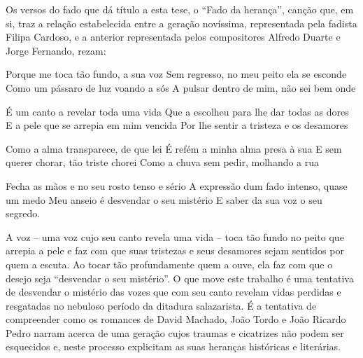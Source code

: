 \documentclass[../DISSERTACAO_MAIN.tex]{subfiles}
\begin{document}
Os versos do fado que dá título a esta tese, o “Fado da herança”, canção que, em si, traz a relação estabelecida entre a geração novíssima, representada pela fadista Filipa Cardoso, e a anterior representada pelos compositores Alfredo Duarte e Jorge Fernando, rezam:

Porque me toca tão fundo, a sua voz
Sem regresso, no meu peito ela se esconde
Como um pássaro de luz voando a sós
A pulsar dentro de mim, não sei bem onde

É um canto a revelar toda uma vida
Que a escolheu para lhe dar todas as dores
E a pele que se arrepia em mim vencida
Por lhe sentir a tristeza e os desamores

Como a alma transparece, de que lei
É refém a minha alma presa à sua
E sem querer chorar, tão triste chorei
Como a chuva sem pedir, molhando a rua

Fecha as mãos e no seu rosto tenso e sério
A expressão dum fado intenso, quase um medo
Meu anseio é desvendar o seu mistério
E saber da sua voz o seu segredo.

A voz – uma voz cujo seu canto revela uma vida – toca tão fundo no peito que arrepia a pele e faz com que suas tristezas e seus desamores sejam sentidos por quem a escuta. Ao tocar tão profundamente quem a ouve, ela faz com que o desejo seja “desvendar o seu mistério”. O que move este trabalho é uma tentativa de desvendar o mistério das vozes que com seu canto revelam vidas perdidas e resgatadas no nebuloso período da ditadura salazarista. É a tentativa de compreender como os romances de David Machado, João Tordo e João Ricardo Pedro narram acerca de uma geração cujos traumas e cicatrizes não podem ser esquecidos e, neste processo explicitam as suas heranças históricas e literárias. 
\end{document}
